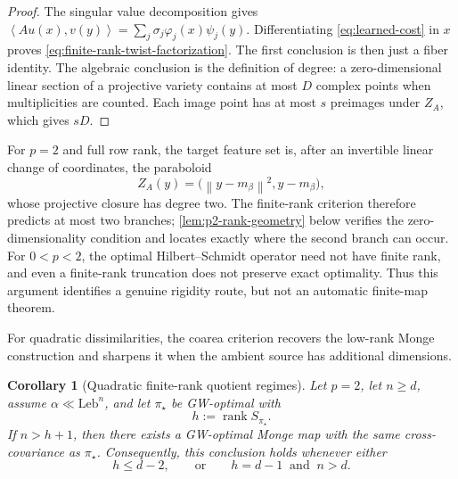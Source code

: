 \documentclass[11pt,a4paper]{article}
\newtheorem{corollary}[theorem]{Corollary}
\theoremstyle{definition}
\theoremstyle{remark}
\newcommand{\rank}{\operatorname{rank}}
\newcommand{\norm}[1]{\left\lVert #1\right\rVert}
\newcommand{\ip}[2]{\left\langle #1,#2\right\rangle}
\begin{document}
\begin{proof}
The singular value decomposition gives
\(
 \ip{Au(x)}{v(y)}=\sum_j\sigma_j\varphi_j(x)\psi_j(y).
\)
Differentiating \eqref{eq:learned-cost} in \(x\) proves
\eqref{eq:finite-rank-twist-factorization}.  The first conclusion is then
just a fiber identity.  The algebraic conclusion is the definition of degree:
a zero-dimensional linear section of a projective variety contains at most
\(D\) complex points when multiplicities are counted.  Each image point has
at most \(s\) preimages under \(Z_A\), which gives \(sD\).
\end{proof}

For \(p=2\) and full row rank, the target feature set is, after an invertible
linear change of coordinates, the paraboloid
\begin{equation}
  Z_A(y)=\bigl(\norm{y-m_\beta}^2,y-m_\beta\bigr),
  \label{eq:p2-augmented-feature-paraboloid}
\end{equation}
whose projective closure has degree two.  The finite-rank criterion therefore
predicts at most two branches; \cref{lem:p2-rank-geometry} below verifies the
zero-dimensionality condition and locates exactly where the second branch can
occur.  For \(0<p<2\), the optimal Hilbert--Schmidt operator need not have
finite rank, and even a finite-rank truncation does not preserve exact
optimality.  Thus this argument identifies a genuine rigidity route, but not
an automatic finite-map theorem.

For quadratic dissimilarities, the coarea criterion recovers the low-rank
Monge construction and sharpens it when the ambient source has additional
dimensions.

\begin{corollary}[Quadratic finite-rank quotient regimes]
\label{cor:p2-finite-rank-quotient}
Let \(p=2\), let \(n\geq d\), assume
\(\alpha\ll\mathrm{Leb}^n\), and let \(\pi_\star\) be GW-optimal with
\begin{equation}
  h:=\rank S_{\pi_\star}.
  \label{eq:p2-optimal-rank-h}
\end{equation}
If \(n>h+1\), then there exists a GW-optimal Monge map with the same
cross-covariance as \(\pi_\star\).  Consequently, this conclusion holds
whenever either
\begin{equation}
  h\leq d-2,
  \qquad\text{or}\qquad
  h=d-1\ \text{ and }\ n>d.
  \label{eq:p2-quotient-rank-regimes}
\end{equation}
\end{corollary}
\end{document}
